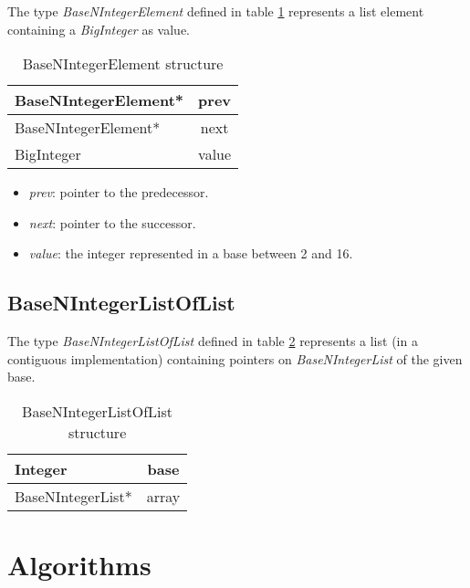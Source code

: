 \documentclass[book, nodocumentinfo]{upmethodology-document}
\begin{document}
The type \emph{BaseNIntegerElement} defined in table \ref{tab:basenintegerelement-struct} represents
a list element containing a \emph{BigInteger} as value.

\begin{table}[h]
    \centering

    \begin{tabular}{|l|c|}
        \hline
        BaseNIntegerElement* & prev \\
        \hline
        BaseNIntegerElement* & next \\
        \hline
        BigInteger & value \\
        \hline
    \end{tabular}

    \caption{BaseNIntegerElement structure}
    \label{tab:basenintegerelement-struct}
\end{table}

\begin{itemize}
    \item \emph{prev}: pointer to the predecessor.
    \item \emph{next}: pointer to the successor.
    \item \emph{value}: the integer represented in a base between 2 and 16.
\end{itemize}

\section{BaseNIntegerListOfList} \label{section:basen-integer-list-of-list}

The type \emph{BaseNIntegerListOfList} defined in table \ref{tab:basenintegerlistoflist-struct} represents
a list (in a contiguous implementation) containing pointers on \emph{BaseNIntegerList} of the given base.

\begin{table}[h]
    \centering

    \begin{tabular}{|l|c|}
        \hline
        Integer & base \\
        \hline
        BaseNIntegerList* & array \\
        \hline
    \end{tabular}

    \caption{BaseNIntegerListOfList structure}
    \label{tab:basenintegerlistoflist-struct}
\end{table}

\chapter{Algorithms} \label{chapter:algorithms}
\end{document}
